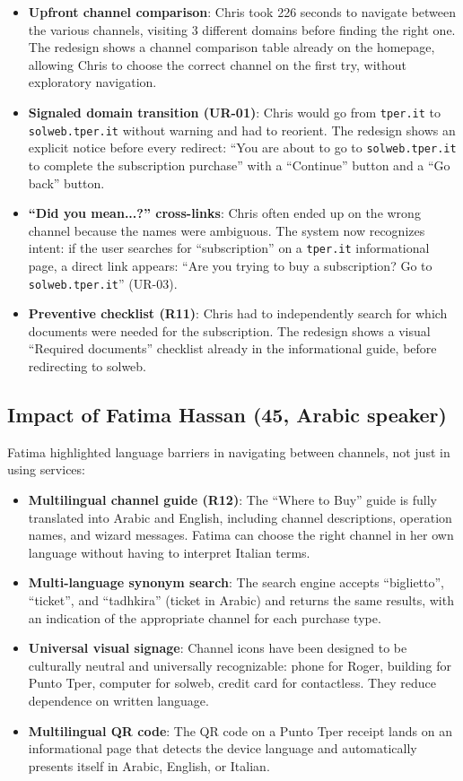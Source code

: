 \begin{itemize}
    \item \textbf{Upfront channel comparison}: Chris took 226 seconds to navigate between the various channels, visiting 3 different domains before finding the right one. The redesign shows a channel comparison table already on the homepage, allowing Chris to choose the correct channel on the first try, without exploratory navigation.
    \item \textbf{Signaled domain transition (UR-01)}: Chris would go from \texttt{tper.it} to \texttt{solweb.tper.it} without warning and had to reorient. The redesign shows an explicit notice before every redirect: ``You are about to go to \texttt{solweb.tper.it} to complete the subscription purchase'' with a ``Continue'' button and a ``Go back'' button.
    \item \textbf{``Did you mean...?'' cross-links}: Chris often ended up on the wrong channel because the names were ambiguous. The system now recognizes intent: if the user searches for ``subscription'' on a \texttt{tper.it} informational page, a direct link appears: ``Are you trying to buy a subscription? Go to \texttt{solweb.tper.it}'' (UR-03).
    \item \textbf{Preventive checklist (R11)}: Chris had to independently search for which documents were needed for the subscription. The redesign shows a visual ``Required documents'' checklist already in the informational guide, before redirecting to solweb.
\end{itemize}

\subsection{Impact of Fatima Hassan (45, Arabic speaker)}

Fatima highlighted language barriers in navigating between channels, not just in using services:

\begin{itemize}
    \item \textbf{Multilingual channel guide (R12)}: The ``Where to Buy'' guide is fully translated into Arabic and English, including channel descriptions, operation names, and wizard messages. Fatima can choose the right channel in her own language without having to interpret Italian terms.
    \item \textbf{Multi-language synonym search}: The search engine accepts ``biglietto'', ``ticket'', and ``tadhkira'' (ticket in Arabic) and returns the same results, with an indication of the appropriate channel for each purchase type.
    \item \textbf{Universal visual signage}: Channel icons have been designed to be culturally neutral and universally recognizable: phone for Roger, building for Punto Tper, computer for solweb, credit card for contactless. They reduce dependence on written language.
    \item \textbf{Multilingual QR code}: The QR code on a Punto Tper receipt lands on an informational page that detects the device language and automatically presents itself in Arabic, English, or Italian.
\end{itemize}


